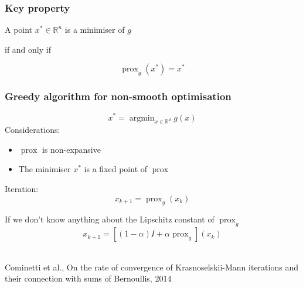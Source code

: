 \documentclass[aspectratio=169]{beamer}
\DeclareMathOperator{\Prox}{prox}
\newcommand{\prox}[2]{\Prox_{#1}\left({#2}\right)}
\newcommand{\RR}{\mathbb{R}}
\newcommand{\rd}{\mathbb{R}^d}
\newcommand{\normtwosq}[1]{\left\|#1\right\|_2^2}
\DeclareMathOperator*{\argmin}{argmin}
\begin{document}
		
		\begin{frame}
		\frametitle{Key property}
		\begin{center}
		A point $x^*\in \RR^n$ is a minimiser of $g$
		
		 if and only if 
		\end{center}
		\begin{equation}
		\nonumber \prox{g}{x^*} = x^*
		\end{equation}
		\end{frame}
		
		\begin{frame}
		\frametitle{Greedy algorithm for non-smooth optimisation}
		\begin{equation}
		\nonumber x^* = \argmin_{x\in \rd} g(x)
		\end{equation}
		\pause
		Considerations:
		\begin{itemize}
		\pause\item $\Prox$ is non-expansive
		\pause\item The minimiser $x^*$ is a fixed point of $\Prox$
		\end{itemize}
		\pause
		Iteration:
		\begin{equation}\nonumber
		x_{k+1} = \prox{g}{x_k}
		\end{equation}
		
		\pause
		If we don't know anything about the Lipschitz constant of $\Prox_g$
		\begin{equation}
		\nonumber x_{k+1} = [(1-\alpha)I + \alpha\Prox_g](x_k)
		\end{equation}
		\quad \\
		\begin{center}
		\textcolor{ExecusharesGrey}{\tiny Cominetti et al., On the rate of convergence of Krasnoselskii-Mann iterations and their connection with sums of Bernoullis, 2014}
		\end{center}
		\end{frame}
		
		
\end{document}

